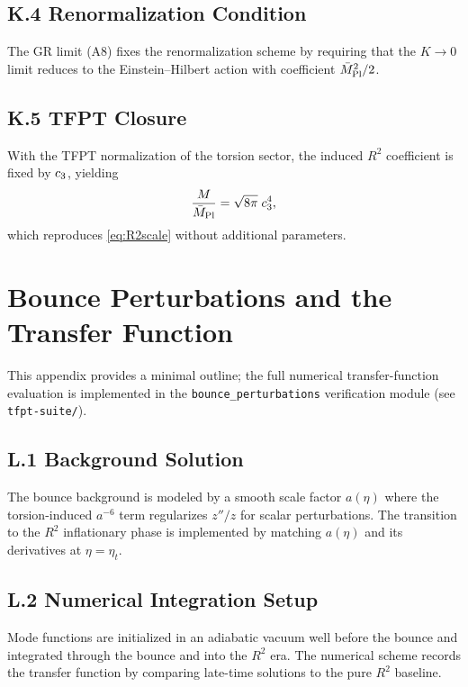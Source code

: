 \subsection{K.4 Renormalization Condition}
The GR limit (A8) fixes the renormalization scheme by requiring that the $K\to 0$ limit
reduces to the Einstein--Hilbert action with coefficient $\bar{M}_{\mathrm{Pl}}^2/2$.

\subsection{K.5 TFPT Closure}
With the TFPT normalization of the torsion sector, the induced $R^2$ coefficient is fixed by
$c_3$, yielding
\begin{equation}
    \frac{M}{\bar{M}_{\mathrm{Pl}}}=\sqrt{8\pi}\;c_3^4,
\end{equation}
which reproduces \eqref{eq:R2scale} without additional parameters.

\section{Bounce Perturbations and the Transfer Function}
\label{app:bounce}

\begin{tcolorbox}[colback=gray!5, colframe=gray!60, 
    title={\textbf{Status Note}}, fonttitle=\bfseries\small]
This appendix provides a minimal outline; the full numerical transfer-function evaluation
is implemented in the \texttt{bounce\_perturbations} verification module (see \texttt{tfpt-suite/}).
\end{tcolorbox}

\subsection{L.1 Background Solution}
The bounce background is modeled by a smooth scale factor $a(\eta)$ where the torsion-induced
$a^{-6}$ term regularizes $z''/z$ for scalar perturbations. The transition to the $R^2$
inflationary phase is implemented by matching $a(\eta)$ and its derivatives at $\eta=\eta_t$.

\subsection{L.2 Numerical Integration Setup}
Mode functions are initialized in an adiabatic vacuum well before the bounce and integrated
through the bounce and into the $R^2$ era. The numerical scheme records the transfer function
by comparing late-time solutions to the pure $R^2$ baseline.

